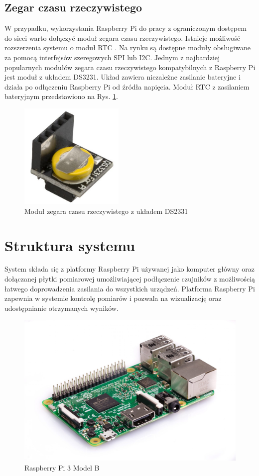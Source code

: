 \subsection{Zegar czasu rzeczywistego}

W przypadku, wykorzystania Raspberry Pi do pracy z ograniczonym dostępem do sieci warto dołączyć moduł zegara czasu rzeczywistego.
Istnieje możliwość rozszerzenia systemu o moduł RTC . Na rynku są dostępne moduły obsługiwane za pomocą interfejsów szeregowych SPI lub I2C. Jednym z najbardziej popularnych modułów zegara czasu rzeczywistego kompatybilnych z Raspberry Pi jest moduł z układem DS3231\cite{rtc}. Układ zawiera niezależne zasilanie bateryjne i działa po odłączeniu Raspberry Pi od źródła napięcia.
Moduł RTC z zasilaniem bateryjnym przedstawiono na Rys. \ref{pic:rtc}. 

\begin{figure}[h]
	\centering
		\includegraphics[width=5cm]{rtc}
	\caption{Moduł zegara czasu rzeczywistego z układem DS2331} 
	\label{pic:rtc}
\end{figure}

\section{Struktura systemu}

System składa się z platformy Raspberry Pi używanej jako komputer główny oraz dołączanej płytki pomiarowej umożliwiającej podłączenie czujników z możliwością łatwego doprowadzenia zasilania do wszystkich urządzeń. Platforma Raspberry Pi zapewnia w systemie kontrolę pomiarów i pozwala na wizualizację oraz udostępnianie otrzymanych wyników. 


\begin{figure}[h]
	\centering
		\includegraphics[width=14cm]{rpi}
	\caption{Raspberry Pi 3 Model B} 
	\label{pic:RPi}
\end{figure}

